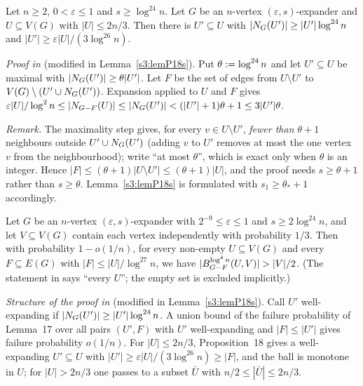 \begin{citedresult}[{\cite[Proposition~18]{BM}}]\label{s1:citProp18}
Let $n\ge2$, $0<\varepsilon\le1$ and $s\ge\log^{24}n$. Let $G$ be an $n$-vertex
$(\varepsilon,s)$-expander and $U\subseteq V(G)$ with $|U|\le2n/3$. Then there is
$U'\subseteq U$ with $|N_G(U')|\ge|U'|\log^{24}n$ and
$|U'|\ge\varepsilon|U|/(3\log^{26}n)$.

\emph{Proof in \cite{BM}} (modified in Lemma~\ref{s3:lemP18s}). Put
$\theta\mathrel{:=}\log^{24}n$ and let $U'\subseteq U$ be maximal with
$|N_G(U')|\ge\theta|U'|$. Let $F$ be the set of edges from $U\setminus U'$ to
$V(G)\setminus(U'\cup N_G(U'))$. Expansion applied to $U$ and $F$ gives
$\varepsilon|U|/\log^2n\le|N_{G-F}(U)|\le|N_G(U')|<(|U'|+1)\theta+1\le
3|U'|\theta$.

\emph{Remark.} The maximality step gives, for every $v\in U\setminus
U'$, \emph{fewer than $\theta+1$} neighbours outside $U'\cup N_G(U')$ (adding
$v$ to $U'$ removes at most the one vertex $v$ from the neighbourhood); \cite{BM}
write ``at most $\theta$'', which is exact only when $\theta$ is an integer.
Hence $|F|\le(\theta+1)|U\setminus U'|\le(\theta+1)|U|$, and the proof needs
$s\ge\theta+1$ rather than $s\ge\theta$. Lemma~\ref{s3:lemP18s} is formulated
with $s_1\ge\theta_*+1$ accordingly.
\end{citedresult}

\begin{citedresult}[{\cite[Lemma~19]{BM}}]\label{s1:citLem19}
Let $G$ be an $n$-vertex $(\varepsilon,s)$-expander with
$2^{-9}\le\varepsilon\le1$ and $s\ge2\log^{24}n$, and let $V\subseteq V(G)$
contain each vertex independently with probability $1/3$. Then with probability
$1-o(1/n)$, for every non-empty $U\subseteq V(G)$ and every $F\subseteq E(G)$ with
$|F|\le|U|/\log^{27}n$, we have $|\Ball{\log^4n}{G-F}{U,V}|>|V|/2$. (The
statement in \cite{BM} says ``every $U$''; the empty set is excluded implicitly.)

\emph{Structure of the proof in \cite{BM}} (modified in
Lemma~\ref{s3:lemP18s}). Call $U'$ well-expanding if
$|N_G(U')|\ge|U'|\log^{24}n$. A union bound of the failure probability of
Lemma~17 over all pairs $(U',F)$ with $U'$ well-expanding and $|F|\le|U'|$ gives
failure probability $o(1/n)$. For $|U|\le2n/3$, Proposition~18 gives a
well-expanding $U'\subseteq U$ with $|U'|\ge\varepsilon|U|/(3\log^{26}n)\ge|F|$,
and the ball is monotone in $U$; for $|U|>2n/3$ one passes to a subset $\bar U$
with $n/2\le|\bar U|\le2n/3$.
\end{citedresult}

